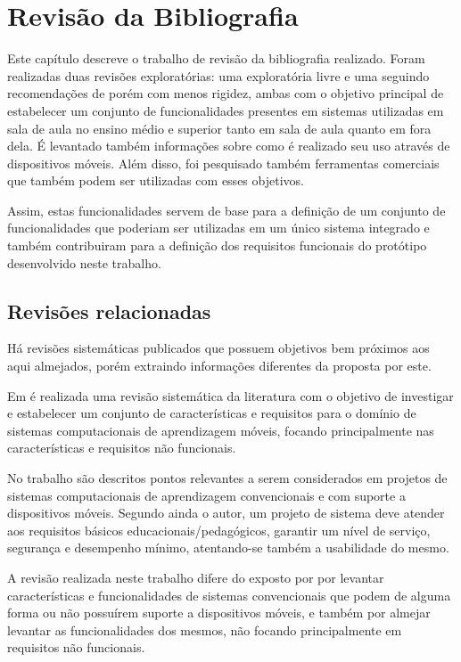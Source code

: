 \chapter{Revisão da Bibliografia}
\label{chap:revisao}

Este capítulo descreve o trabalho de revisão da bibliografia realizado. Foram realizadas duas revisões exploratórias: uma exploratória livre e uma seguindo recomendações de  porém com menos rigidez, ambas com o objetivo principal de estabelecer um conjunto de funcionalidades presentes em sistemas utilizadas em sala de aula no ensino médio e superior tanto em sala de aula quanto em fora dela. É levantado também informações sobre como é realizado seu uso através de dispositivos móveis. Além disso, foi pesquisado também ferramentas comerciais que também podem ser utilizadas com esses objetivos. 

Assim, estas funcionalidades servem de base para a definição de um conjunto de funcionalidades que poderiam ser utilizadas em um único sistema integrado e também contribuiram para a definição dos requisitos funcionais do protótipo desenvolvido neste trabalho.
 
\section{Revisões relacionadas}

Há revisões sistemáticas publicados que possuem objetivos bem próximos aos aqui almejados, porém extraindo informações diferentes da proposta por este.

Em  é realizada uma revisão sistemática da literatura com o objetivo de investigar e estabelecer um conjunto de características e requisitos para o domínio de sistemas computacionais de aprendizagem móveis, focando principalmente nas características e requisitos não funcionais.

No trabalho são descritos pontos relevantes a serem considerados em projetos de sistemas computacionais de aprendizagem convencionais e com suporte a dispositivos móveis. Segundo ainda o autor, um projeto de sistema deve atender aos requisitos básicos educacionais/pedagógicos, garantir um nível de serviço, segurança e desempenho mínimo, atentando-se também a usabilidade do mesmo.

A revisão realizada neste trabalho difere do exposto por  por levantar características e funcionalidades de sistemas convencionais que podem de alguma forma ou não possuírem suporte a dispositivos móveis, e também por almejar levantar as funcionalidades dos mesmos, não focando principalmente em requisitos não funcionais.


